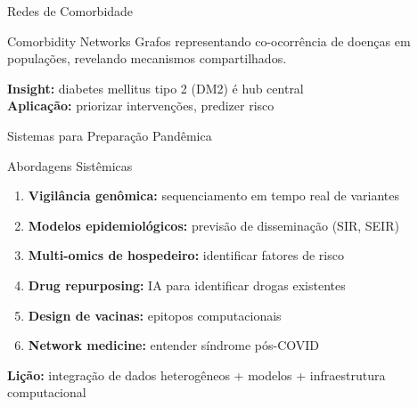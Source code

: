 \begin{frame}{Redes de Comorbidade}
\begin{block}{Comorbidity Networks}
Grafos representando co-ocorrência de doenças em populações, revelando mecanismos compartilhados.
\end{block}

\begin{center}
\end{center}

\textbf{Insight:} diabetes mellitus tipo 2 (DM2) é hub central\\
\textbf{Aplicação:} priorizar intervenções, predizer risco
\end{frame}

\begin{frame}{Sistemas para Preparação Pandêmica}

\vspace{0.3cm}

\begin{block}{Abordagens Sistêmicas}
\begin{enumerate}
    \item \textbf{Vigilância genômica:} sequenciamento em tempo real de variantes
    \item \textbf{Modelos epidemiológicos:} previsão de disseminação (SIR, SEIR)
    \item \textbf{Multi-omics de hospedeiro:} identificar fatores de risco
    \item \textbf{Drug repurposing:} IA para identificar drogas existentes
    \item \textbf{Design de vacinas:} epitopos computacionais
    \item \textbf{Network medicine:} entender síndrome pós-COVID
\end{enumerate}
\end{block}

\vspace{0.3cm}

\textbf{Lição:} integração de dados heterogêneos + modelos + infraestrutura computacional
\end{frame}

